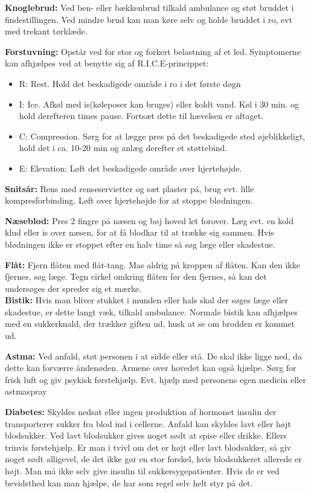\documentclass[../../../main.tex]{subfiles}
\begin{document}
\textbf{Knoglebrud:} Ved ben- eller bækkenbrud tilkald ambulance og støt bruddet i findestillingen. Ved mindre brud kan man køre selv og holde bruddet i ro, evt med trekant tørklæde.


\textbf{Forstuvning:} Opstår ved for stor og forkert belastning af et led. Symptomerne kan afhjælpes ved at benytte sig af R.I.C.E-princippet:
\begin{itemize}
    \item R: Rest. Hold det beskadigede område i ro i det første døgn
    \item I: Ice. Afkøl med is(køleposer kan bruges) eller koldt vand. Køl i 30 min. og hold derefteren times pause. Fortsæt dette til hævelsen er aftaget.
    \item C: Compression. Sørg for at lægge pres på det beskadigede sted øjeblikkeligt, hold det i ca. 10-20 min og anlæg derefter et støttebind.
    \item E: Elevation: Løft det beskadigede område over hjertehøjde.
\end{itemize}

\textbf{Snitsår:} Rens med renseservietter og sæt plaster på, brug evt. lille kompresforbinding. Løft over hjertehøjde for at stoppe blødningen.


\textbf{Næseblod:} Pres 2 fingre på næsen og bøj hoved let forover. Læg evt. en kold klud eller is over næsen, for at få blodkar til at trække sig sammen. Hvis blødningen ikke er stoppet efter en halv time så søg læge eller skadestue.


\textbf{Flåt:} Fjern flåten med flåt-tang. Mas aldrig på kroppen af flåten. Kan den ikke fjernes, søg læge. Tegn cirkel omkring flåten før den fjernes, så kan det undersøges der spreder sig et mærke.\\
\newline
\textbf{Bistik:} Hvis man bliver stukket i munden eller hals skal der søges læge eller skadestue, er dette langt væk, tilkald ambulance. Normale bistik kan afhjælpes med en sukkerknald, der trækker giften ud, husk at se om brodden er kommet ud. 


\textbf{Astma:} Ved anfald, støt personen i at sidde eller stå. De skal ikke ligge ned, da dette kan forværre åndenøden. Armene over hovedet kan også hjælpe. Sørg for frisk luft og giv psykisk førstehjælp. Evt. hjælp med personens egen medicin eller astmaspray 


\textbf{Diabetes:} Skyldes nedsat eller ingen produktion af hormonet insulin der transporterer sukker fra blod ind i cellerne. Anfald kan skyldes lavt eller højt blodsukker. Ved lavt blodsukker gives noget sødt at spise eller drikke. Ellers trinvis førstehjælp. Er man i tvivl om det er højt eller lavt blodsukker, så giv noget sødt alligevel, de det ikke gør en stor forskel, hvis blodsukkeret allerede er højt. Man må ikke selv give insulin til sukkersygepatienter. Hvis de er ved bevidsthed kan man hjælpe, de har som regel selv helt styr på det.
\end{document}
